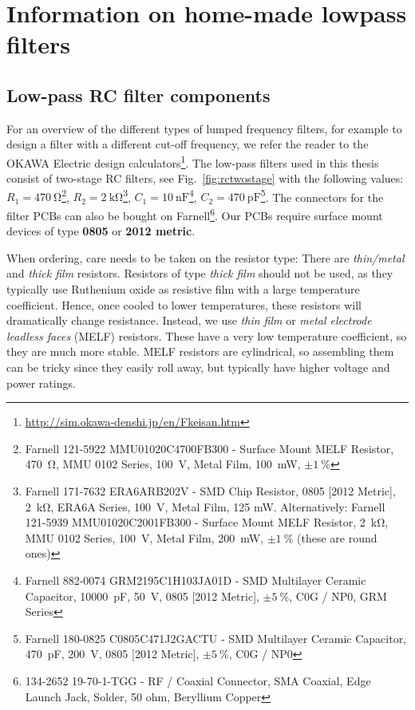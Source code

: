 \newchapstyle
\chapter{Information on home-made lowpass filters}
\afterpage{\pagecolor{none}}\newpage
\section{Low-pass RC filter components}\label{app:lowpassfilter}

For an overview of the different types of lumped frequency filters, for example to design a filter with a different cut-off frequency, we refer the reader to the OKAWA Electric design calculators\footnote{\url{http://sim.okawa-denshi.jp/en/Fkeisan.htm}}.
%
The low-pass filters used in this thesis consist of two-stage RC filters, see Fig.~\ref{fig:rctwostage} with the following values:
%
$R_1=\SI{470}{\ohm}$\footnote{Farnell 121-5922 MMU01020C4700FB300 - Surface Mount MELF Resistor, \SI{470}{\ohm}, MMU 0102 Series, \SI{100}{V}, Metal Film, \SI{100}{\milli\watt}, $\pm\SI{1}{\percent}$}, $R_2=\SI{2}{\kilo\ohm}$\footnote{Farnell 171-7632 ERA6ARB202V - SMD Chip Resistor, 0805 [2012 Metric], \SI{2}{\kilo\ohm}, ERA6A Series, \SI{100}{V}, Metal Film, 125 mW. Alternatively: Farnell 121-5939 MMU01020C2001FB300 - Surface Mount MELF Resistor, \SI{2}{\kilo\ohm}, MMU 0102 Series, \SI{100}{V}, Metal Film, \SI{200}{\milli\watt}, $\pm\SI{1}{\percent}$ (these are round ones)}, $C_1=\SI{10}{\nano\farad}$\footnote{Farnell 882-0074 GRM2195C1H103JA01D - SMD Multilayer Ceramic Capacitor, \SI{10000}{\pico\farad}, \SI{50}{V}, 0805 [2012 Metric], $\pm\SI{5}{\percent}$, C0G / NP0, GRM Series}, $C_2=\SI{470}{\pico\farad}$\footnote{Farnell 180-0825 C0805C471J2GACTU - SMD Multilayer Ceramic Capacitor, \SI{470}{\pico\farad}, \SI{200}{V}, 0805 [2012 Metric], $\pm\SI{5}{\percent}$, C0G / NP0}.
%
The connectors for the filter PCBs can also be bought on Farnell\footnote{134-2652 19-70-1-TGG - RF / Coaxial Connector, SMA Coaxial, Edge Launch Jack, Solder, 50 ohm, Beryllium Copper}.
%
Our PCBs require surface mount devices of type \textbf{0805} or \textbf{2012 metric}.

When ordering, care needs to be taken on the resistor type:
%
There are \textit{thin/metal} and \textit{thick film} resistors.
%
Resistors of type \textit{thick film} should not be used, as they typically use Ruthenium oxide as resistive film with a large temperature coefficient.
%
Hence, once cooled to lower temperatures, these resistors will dramatically change resistance.
%
Instead, we use \textit{thin film} or \textit{metal electrode leadless faces} (MELF) resistors.
%
These have a very low temperature coefficient, so they are much more stable.
%
MELF resistors are cylindrical, so assembling them can be tricky since they easily roll away, but typically have higher voltage and power ratings.

